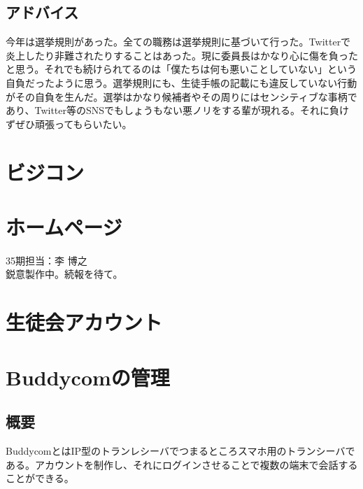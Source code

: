 \documentclass[dvipdfmx,jb5]{jreport}
\begin{document}
\subsection{アドバイス}
今年は選挙規則があった。全ての職務は選挙規則に基づいて行った。Twitterで炎上したり非難されたりすることはあった。現に委員長はかなり心に傷を負ったと思う。それでも続けられてるのは「僕たちは何も悪いことしていない」という自負だったように思う。選挙規則にも、生徒手帳の記載にも違反していない行動がその自負を生んだ。選挙はかなり候補者やその周りにはセンシティブな事柄であり、Twitter等のSNSでもしょうもない悪ノリをする輩が現れる。それに負けずぜひ頑張ってもらいたい。
\section{ビジコン}
\section{ホームページ}
35期担当：李 博之\\
鋭意製作中。続報を待て。
\section{生徒会アカウント}

\section{Buddycomの管理}
\subsection{概要}
BuddycomとはIP型のトランレシーバでつまるところスマホ用のトランシーバである。アカウントを制作し、それにログインさせることで複数の端末で会話することができる。
\end{document}
